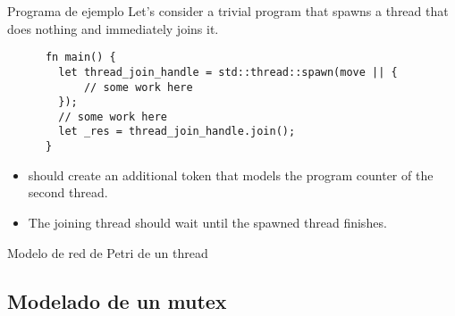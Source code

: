 \documentclass{beamer}
\begin{document}
\begin{frame}[fragile]{Programa de ejemplo}
  Let's consider a trivial program that spawns a thread that does nothing
  and immediately joins it.

  \vfill

  \begin{listing}
    \begin{verbatim}
      fn main() {
        let thread_join_handle = std::thread::spawn(move || {
            // some work here
        });
        // some work here
        let _res = thread_join_handle.join();
      }   
    \end{verbatim}
  \end{listing}

  \vfill

  \begin{itemize}
    \item {} should create an additional token
          that models the program counter of the second thread.
    \item The joining thread should wait until the spawned thread finishes.
  \end{itemize}
\end{frame}

\begin{frame}{Modelo de red de Petri de un thread}
  \begin{figure}
    \centering
    
  \end{figure}
\end{frame}

\subsection{Modelado de un mutex}
\end{document}
